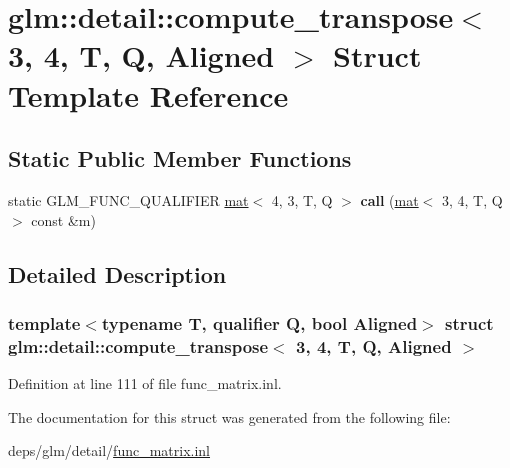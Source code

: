 \hypertarget{structglm_1_1detail_1_1compute__transpose_3_013_00_014_00_01T_00_01Q_00_01Aligned_01_4}{}\section{glm\+:\+:detail\+:\+:compute\+\_\+transpose$<$ 3, 4, T, Q, Aligned $>$ Struct Template Reference}
\label{structglm_1_1detail_1_1compute__transpose_3_013_00_014_00_01T_00_01Q_00_01Aligned_01_4}
\subsection*{Static Public Member Functions}
\begin{DoxyCompactItemize}
\item 
\mbox{\label{structglm_1_1detail_1_1compute__transpose_3_013_00_014_00_01T_00_01Q_00_01Aligned_01_4_a64a4ddeead1663b8289e74e0fc262078}} 
static G\+L\+M\+\_\+\+F\+U\+N\+C\+\_\+\+Q\+U\+A\+L\+I\+F\+I\+ER \hyperlink{structglm_1_1mat}{mat}$<$ 4, 3, T, Q $>$ {\bfseries call} (\hyperlink{structglm_1_1mat}{mat}$<$ 3, 4, T, Q $>$ const \&m)
\end{DoxyCompactItemize}


\subsection{Detailed Description}
\subsubsection*{template$<$typename T, qualifier Q, bool Aligned$>$\newline
struct glm\+::detail\+::compute\+\_\+transpose$<$ 3, 4, T, Q, Aligned $>$}



Definition at line 111 of file func\+\_\+matrix.\+inl.



The documentation for this struct was generated from the following file\+:\begin{DoxyCompactItemize}
\item 
deps/glm/detail/\hyperlink{func__matrix_8inl}{func\+\_\+matrix.\+inl}\end{DoxyCompactItemize}
